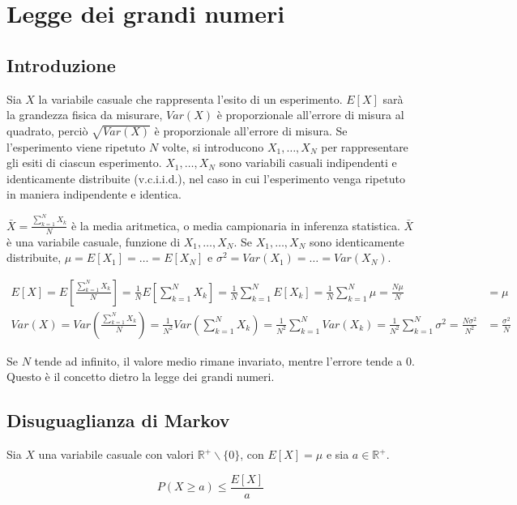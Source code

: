 \documentclass{article}
\begin{document}
\section{Legge dei grandi numeri}

\subsection{Introduzione}

Sia $X$ la variabile casuale che rappresenta l'esito di un esperimento.
$E[X]$ sarà la grandezza fisica da misurare, $Var(X)$ è proporzionale all'errore di misura al quadrato, perciò $\sqrt{Var(X)}$ è proporzionale all'errore di misura.
Se l'esperimento viene ripetuto $N$ volte, si introducono $X_1, \dots, X_N$ per rappresentare gli esiti di ciascun esperimento.
$X_1, \dots, X_N$ sono variabili casuali indipendenti e identicamente distribuite (v.c.i.i.d.), nel caso in cui l'esperimento venga ripetuto in maniera indipendente e identica.

\noindent
$\bar{X} = \frac{\sum^N_{k=1}X_k}{N}$ è la media aritmetica, o media campionaria in inferenza statistica.
$\bar{X}$ è una variabile casuale, funzione di $X_1, \dots, X_N$.
Se $X_1, \dots, X_N$ sono identicamente distribuite, $\mu=E[X_1]=\dots=E[X_N]$ e $\sigma^2=Var(X_1)=\dots=Var(X_N)$.

$$
\begin{matrix}
E[X] = E[\frac{\sum^N_{k=1}X_k}{N}] = \frac{1}{N} E[\sum^N_{k=1}X_k] = \frac{1}{N} \sum^N_{k=1} E[X_k] = \frac{1}{N} \sum^N_{k=1} \mu = \frac{N\mu}{N} &= \mu \\
Var(X) = Var(\frac{\sum^N_{k=1}X_k}{N}) = \frac{1}{N^2} Var(\sum^N_{k=1}X_k) = \frac{1}{N^2} \sum^N_{k=1} Var(X_k) = \frac{1}{N^2} \sum^N_{k=1} \sigma^2 = \frac{N\sigma^2}{N^2} &= \frac{\sigma^2}{N}
\end{matrix}
$$

\noindent
Se $N$ tende ad infinito, il valore medio rimane invariato, mentre l'errore tende a 0. Questo è il concetto dietro la legge dei grandi numeri.

\subsection{Disuguaglianza di Markov}

Sia $X$ una variabile casuale con valori $\mathbb{R}^+ \backslash \{0\}$, con $E[X]=\mu$ e sia $a \in \mathbb{R}^+$.

$$
P(X \geq a) \leq \frac{E[X]}{a}
$$
\end{document}
